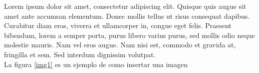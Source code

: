 \documentclass[11pt,letterpaper]{article}
\begin{document}
Lorem ipsum dolor sit amet, consectetur adipiscing elit. Quisque quis augue sit amet ante accumsan elementum. Donec mollis tellus ut risus consequat dapibus. Curabitur diam eros, viverra et ullamcorper in, congue eget felis. Praesent bibendum, lorem a semper porta, purus libero varius purus, sed mollis odio neque molestie mauris. Nam vel eros augue. Nam nisi est, commodo et gravida at, fringilla et sem. Sed interdum dignissim volutpat. \\ %

La figura \ref{img1} es un ejemplo de como insertar una imagen

\begin{figure}[ht!] \centering
{}

\end{figure}
\end{document}
